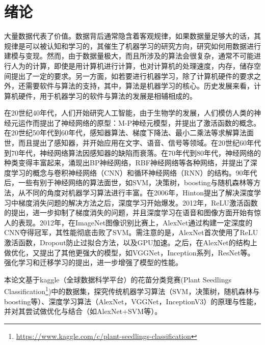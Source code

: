 \chapter{绪论}
大量数据代表了价值。数据背后通常隐含着客观规律，如果数据量足够大的话，其规律是可以被认知和学习的，其催生了机器学习的研究方向，研究如何用数据进行建模与变现。然而，由于数据量极大，而且所涉及的算法会很复杂，通常不可能进行人为的计算，即使是用计算机进行计算，也对计算机的处理速度，内存，储存空间提出了一定的要求。另一方面，如若要进行机器学习，除了计算机硬件的要求之外，还需要软件与算法的支持，其中，算法是机器学习的核心。历史发展来看，计算机硬件，用于机器学习的软件与算法的发展是相辅相成的。

在20世纪40年代，人们开始研究人工智能，由于生物学的发展，人们模仿人类的神经元运作而提出了神经网络的原型：M-P神经元模型，并提出了激活函数的概念。在20世纪50年代到60年代，感知器算法、梯度下降法、最小二乘法等求解算法面世，而且提出了感知器，并开始应用在文字、语音、信号等领域。在20世纪60年代到70年代，神经网络算法因感知器的缺陷而衰落。在70年代到80年代，神经网络的种类变得丰富起来，涌现出BP神经网络，RBF神经网络等各种网络，并提出了深度学习的概念与卷积神经网络（CNN）和循环神经网络（RNN）的结构。90年代后，一些有别于神经网络的算法面世，如SVM，决策树，boosting与随机森林等方法，从不同的角度对机器学习算法进行丰富。在2006年，Hinton提出了解决深度学习中梯度消失问题的解决方法之后，深度学习开始爆发。2012年，ReLU激活函数的提出，进一步抑制了梯度消失的问题，并且深度学习在语音和图像方面开始有惊人的表现。2012年，在ImageNet图像识别比赛上，AlexNet通过构建一定深度的CNN夺得冠军，其性能彻底击败了SVM。需注意的是，AlexNet首次使用了ReLU激活函数，Dropout防止过拟合方法，以及GPU加速。之后，在AlexNet的结构上做优化，又提出了其他更强大的模型，如VGGNet，Inception系列，ResNet等。强化学习和迁移学习的提出，进一步增强了模型的性能。

本论文基于kaggle（全球数据科学平台）的花苗分类竞赛(Plant Seedlings Classification\footnote{\url{https://www.kaggle.com/c/plant-seedlings-classification}})中的数据集，探究传统机器学习算法（SVM，决策树，随机森林与boosting等）、深度学习算法（AlexNet，VGGNet，InceptionV3）的原理与性能，并对其尝试做优化与结合（如AlexNet+SVM等）。
